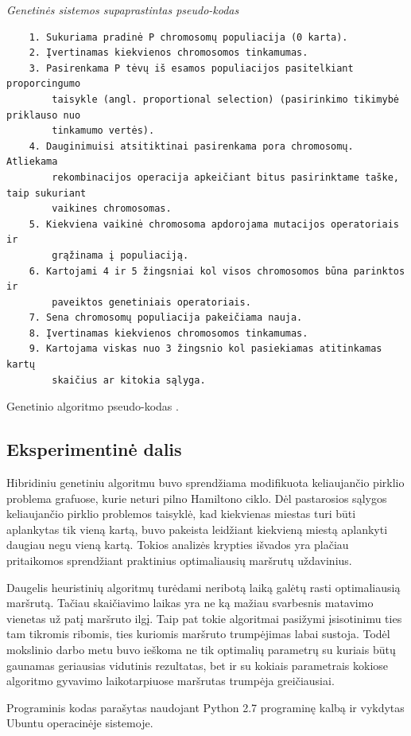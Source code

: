\documentclass[runningheads,a4paper]{llncs}
\begin{document}
\medskip

\noindent
{\it Genetinės sistemos supaprastintas pseudo-kodas}
\begin{verbatim}
    1. Sukuriama pradinė P chromosomų populiacija (0 karta).
    2. Įvertinamas kiekvienos chromosomos tinkamumas.
    3. Pasirenkama P tėvų iš esamos populiacijos pasitelkiant proporcingumo 
        taisykle (angl. proportional selection) (pasirinkimo tikimybė priklauso nuo 
        tinkamumo vertės).
    4. Dauginimuisi atsitiktinai pasirenkama pora chromosomų. Atliekama 
        rekombinacijos operacija apkeičiant bitus pasirinktame taške, taip sukuriant 
        vaikines chromosomas.
    5. Kiekviena vaikinė chromosoma apdorojama mutacijos operatoriais ir 
        grąžinama į populiaciją.
    6. Kartojami 4 ir 5 žingsniai kol visos chromosomos būna parinktos ir 
        paveiktos genetiniais operatoriais.
    7. Sena chromosomų populiacija pakeičiama nauja.
    8. Įvertinamas kiekvienos chromosomos tinkamumas.
    9. Kartojama viskas nuo 3 žingsnio kol pasiekiamas atitinkamas kartų 
        skaičius ar kitokia sąlyga.
\end{verbatim}
%
\noindent
{\small Genetinio algoritmo pseudo-kodas \cite{genetictsp}.}


\subsection{Eksperimentinė dalis}

Hibridiniu genetiniu algoritmu buvo sprendžiama modifikuota keliaujančio pirklio problema grafuose, kurie neturi pilno Hamiltono ciklo. Dėl pastarosios sąlygos keliaujančio pirklio problemos taisyklė, kad kiekvienas miestas turi būti aplankytas tik vieną kartą, buvo pakeista leidžiant kiekvieną miestą aplankyti daugiau negu vieną kartą. Tokios analizės krypties išvados yra plačiau pritaikomos sprendžiant praktinius optimaliausių maršrutų uždavinius.

Daugelis heuristinių algoritmų turėdami neribotą laiką galėtų rasti optimaliausią maršrutą. Tačiau skaičiavimo laikas yra ne ką mažiau svarbesnis matavimo vienetas už patį maršruto ilgį. Taip pat tokie algoritmai pasižymi įsisotinimu ties tam tikromis ribomis, ties kuriomis maršruto trumpėjimas labai sustoja. Todėl mokslinio darbo metu buvo ieškoma ne tik optimalių parametrų su kuriais būtų gaunamas geriausias vidutinis rezultatas, bet ir su kokiais parametrais kokiose algoritmo gyvavimo laikotarpiuose maršrutas trumpėja greičiausiai.

Programinis kodas parašytas naudojant Python 2.7 programinę kalbą ir vykdytas Ubuntu operacinėje sistemoje.
\end{document}

